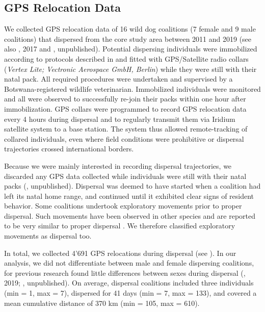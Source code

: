 \documentclass[abstract=on,10pt,a4paper,bibliography=totocnumbered]{scrartcl}
\begin{document}
\subsection{GPS Relocation Data}
We collected GPS relocation data of 16 wild dog coalitions (7 female and 9
male coalitions) that dispersed from the core study area between 2011 and 2019
(see also \citeauthor{Abrahms.2017}, 2017 and \citeauthor{Cozzi.2020},
unpublished). Potential dispersing individuals were immobilized according to
protocols described in \cite{Osofsky.1996} and fitted with GPS/Satellite radio
collars (\textit{Vertex Lite; Vectronic Aerospace GmbH, Berlin}) while they were
still with their natal pack. All required procedures were undertaken and
supervised by a Botswana-registered wildlife veterinarian. Immobilized
individuals were monitored and all were observed to successfully re-join their
packs within one hour after immobilization. GPS collars were programmed to
record GPS relocation data every 4 hours during dispersal and to regularly
transmit them via Iridium satellite system to a base station. The system thus
allowed remote-tracking of collared individuals, even where field conditions
were prohibitive or dispersal trajectories crossed international borders.

Because we were mainly interested in recording dispersal trajectories, we
discarded any GPS data collected while individuals were still with their natal
packs (\citeauthor{Cozzi.2020}, unpublished). Dispersal was deemed to have
started when a coalition had left its natal home range, and continued until it
exhibited clear signs of resident behavior. Some coalitions undertook
exploratory movements prior to proper dispersal. Such movements have been
observed in other species and are reported to be very similar to proper
dispersal \citep{Killeen.2014}. We therefore classified exploratory movements as
dispersal too.

In total, we collected 4'691 GPS relocations during dispersal (see
). In our analysis, we did not differentiate between male and
female dispersing coalitions, for previous research found little differences
between sexes during dispersal (\citeauthor{Woodroffe.2019}, 2019;
\citeauthor{Cozzi.2020}, unpublished). On average, dispersal coalitions included
three individuals (min = 1, max = 7), dispersed for 41 days (min = 7, max =
133), and covered a mean cumulative distance of 370 km (min = 105, max = 610).
\end{document}
